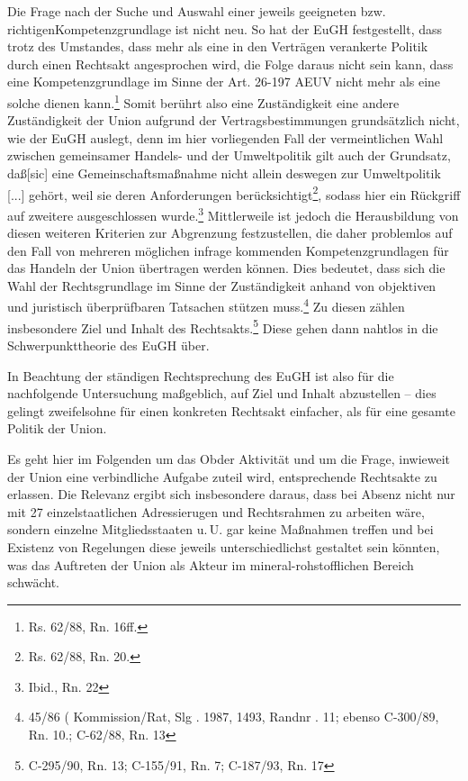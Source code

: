 \documentclass[12pt,a4paper,oneside]{book} %
\begin{document}
Die Frage nach der Suche und Auswahl einer jeweils geeigneten bzw. \glqq richtigen\grqq Kompetenzgrundlage ist nicht neu. So hat der EuGH festgestellt, dass trotz des Umstandes, dass mehr als eine in den Verträgen verankerte Politik durch einen Rechtsakt angesprochen wird, die Folge daraus nicht sein kann, dass eine Kompetenzgrundlage im Sinne der Art. 26-197 AEUV nicht mehr als eine solche dienen kann.\footnote{Rs. 62/88, Rn. 16ff.} Somit berührt also eine Zuständigkeit eine andere Zuständigkeit der Union aufgrund der Vertragsbestimmungen grundsätzlich nicht, wie der EuGH auslegt, denn im hier vorliegenden Fall der vermeintlichen Wahl zwischen gemeinsamer Handels- und der Umweltpolitik gilt auch der Grundsatz, \glqq daß[sic] eine Gemeinschaftsmaßnahme nicht allein deswegen zur Umweltpolitik [...] gehört, weil sie deren Anforderungen berücksichtigt\grqq\footnote{Rs. 62/88, Rn. 20.}, sodass hier ein Rückgriff auf zweitere ausgeschlossen wurde.\footnote{Ibid., Rn. 22} Mittlerweile ist jedoch die Herausbildung von diesen weiteren Kriterien zur Abgrenzung festzustellen, die daher problemlos auf den Fall von mehreren möglichen infrage kommenden Kompetenzgrundlagen für das Handeln der Union übertragen werden können.\autocite{Callies, Berliner Beiträge Nr. 117, S. 11.} Dies bedeutet, dass sich die Wahl der Rechtsgrundlage im Sinne der Zuständigkeit anhand von objektiven und juristisch überprüfbaren Tatsachen stützen muss.\footnote{45/86 ( Kommission/Rat, Slg . 1987, 1493, Randnr . 11; ebenso C-300/89, Rn. 10.; C-62/88, Rn. 13} Zu diesen zählen insbesondere Ziel und Inhalt des Rechtsakts.\footnote{C-295/90, Rn. 13; C-155/91, Rn. 7; C-187/93, Rn. 17} Diese gehen dann nahtlos in die Schwerpunkttheorie des EuGH über.
	
In Beachtung der ständigen Rechtsprechung des EuGH ist also für die nachfolgende Untersuchung maßgeblich, auf Ziel und Inhalt abzustellen -- dies gelingt zweifelsohne für einen konkreten Rechtsakt einfacher, als für eine gesamte Politik der Union.
	
Es geht hier im Folgenden um das \glqq Ob\grqq der Aktivität und um die Frage, inwieweit der Union eine verbindliche Aufgabe zuteil wird, entsprechende Rechtsakte zu erlassen. Die Relevanz ergibt sich insbesondere daraus, dass bei Absenz nicht nur mit 27 einzelstaatlichen Adressierugen und Rechtsrahmen zu arbeiten wäre, sondern einzelne Mitgliedsstaaten u.\,U. gar keine Maßnahmen treffen und bei Existenz von Regelungen diese jeweils unterschiedlichst gestaltet sein könnten, was das Auftreten der Union als Akteur im mineral-rohstofflichen Bereich schwächt.
\end{document}
